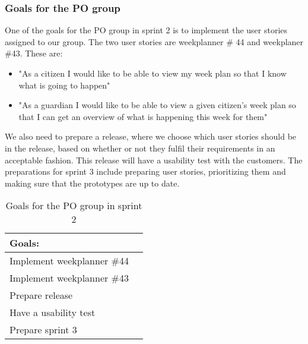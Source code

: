 \subsubsection{Goals for the PO group}
One of the goals for the PO group in sprint 2 is to implement the user stories assigned to our group.
The two user stories are weekplanner \# 44 and weekplaner \#43. These are:
\begin{itemize}
 \item "As a citizen I would like to be able to view my week plan so that I know what is going to happen" 
 \item "As a guardian I would like to be able to view a given citizen's week plan so that I can get an overview of what is happening this week for them"
\end{itemize}
We also need to prepare a release, where we choose which user stories should be in the release, based on whether or not they fulfil their requirements in an acceptable fashion.
This release will have a usability test with the customers.
The preparations for sprint 3 include preparing user stories, prioritizing them and making sure that the prototypes are up to date.
\begin{table}[H]
    \centering
    \begin{tabular}{|l|l|}
    \hline
    Goals:                                   \\ \hline
    Implement weekplanner \#44               \\ \hline
    Implement weekplanner \#43               \\ \hline
    Prepare release                          \\ \hline
    Have a usability test                   \\ \hline
    Prepare sprint 3                         \\ \hline
    \end{tabular}
    \caption{Goals for the PO group in sprint 2}
    \label{PO-goal-sprint-2}
\end{table}
